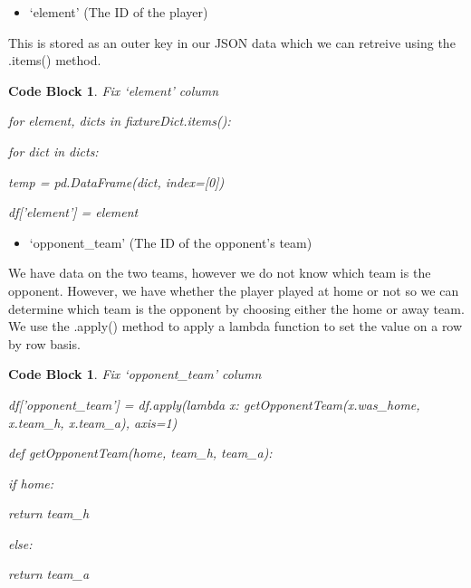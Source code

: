 \documentclass[12pt, a4paper, oneside]{book}
\newtheorem{codeblock}[theorem]{Code Block}
\numberwithin{equation}{section}
\begin{document}
\vspace{0.5cm}

\begin{itemize}
  \item `element' (The ID of the player)
\end{itemize}

This is stored as an outer key in our JSON data which we can retreive using the .items() method.

\begin{codeblock}
  Fix `element' column

  for element, dicts in fixtureDict.items():

  \hspace{\parindent}for dict in dicts:

  \hspace{\parindent}\hspace{\parindent}temp = pd.DataFrame(dict, index=[0])

  \hspace{\parindent}\hspace{\parindent}df['element'] = element

\end{codeblock}

\vspace{0.5cm}

\begin{itemize}
  \item `opponent\_team' (The ID of the opponent's team)
\end{itemize}

We have data on the two teams, however we do not know which team is the opponent. However, we have whether the player played at home or not so we can determine which team is the opponent by choosing either the home or away team. We use the .apply() method to apply a lambda function to set the value on a row by row basis.

\begin{codeblock}
  Fix `opponent\_team' column

  df['opponent\_team'] = df.apply(lambda x: getOpponentTeam(x.was\_home, x.team\_h, x.team\_a), axis=1)

  def getOpponentTeam(home, team\_h, team\_a):
  
  \hspace{\parindent}if home:
  
  \hspace{\parindent}\hspace{\parindent}return team\_h
  
  \hspace{\parindent}else:
  
  \hspace{\parindent}\hspace{\parindent}return team\_a

\end{codeblock}
\end{document}
